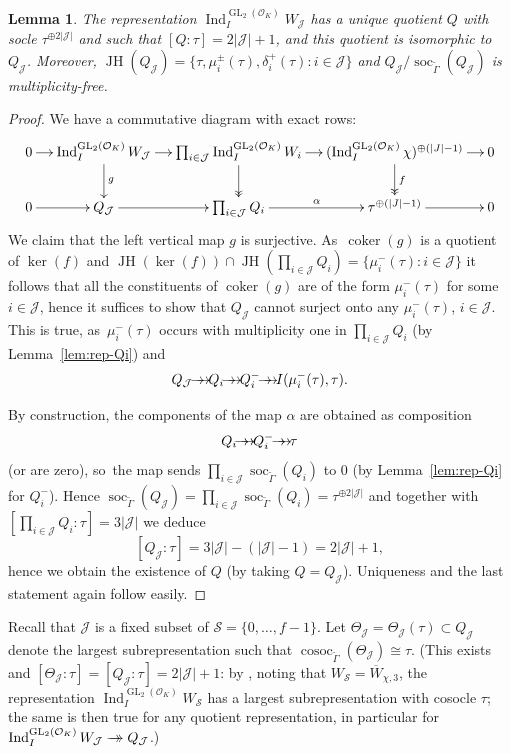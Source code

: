 \documentclass[JEP,XML,SOM,Unicode,NoFloatCountersInSection, NoEqCountersInSection,published]{cedram}
\newcommand{\onto}{\mathchoice{\to\hspace*{-5mm}\to}{\mathrel{\hbox{$\to\hspace*{-2.85mm}\to$}}}{\to\hspace*{-3mm}\to}{\to\hspace*{-3mm}\to}}
\let\wt\widetilde
\let\ovl\overline
\newcommand{\cJ}{{\mathcal{J}}}
\newcommand{\cO}{\mathcal{O}}
\newcommand{\cS}{\mathcal{S}}
\DeclareMathOperator{\coker}{coker}
\DeclareMathOperator{\cosoc}{cosoc}
\DeclareMathOperator{\GL}{GL}
\DeclareMathOperator{\Ind}{Ind}
\DeclareMathOperator{\JH}{\mathrm{JH}}
\DeclareMathOperator{\soc}{soc}
\theoremstyle{plain}
\newtheorem{lem}[prop]{Lemma}
\theoremstyle{definition}
\begin{document}
\begin{lem}\label{lem:rep-QJ}
The representation $\Ind_I^{\GL_2(\cO_K)} W_{\cJ}$ has a unique quotient $Q$ with socle $\tau^{\oplus 2\vert\cJ\vert}$ and such that $[Q:\tau] = 2\vert\cJ\vert+1$, and this quotient is isomorphic to $Q_{\cJ}$.
Moreover, $\JH(Q_\cJ) = \{\tau, \mu_i^\pm(\tau), \delta_i^+(\tau): i \in \cJ \}$ and $Q_\cJ/\soc_{\wt\Gamma}(Q_\cJ)$ is multiplicity-free.
\end{lem}

\begin{proof}
We have a commutative diagram with exact rows:\vspace*{-3pt}
\begin{equation*}
\xymatrix@C=.4cm@R=.7cm{
0 \ar[r] & \Ind_I^{\GL_2(\cO_K)} W_\cJ \ar[r]\ar^g[d] & \prod_{i \in \cJ} \Ind_I^{\GL_2(\cO_K)} W_i \ar[r]\ar@{->>}[d] & (\Ind_I^{\GL_2(\cO_K)} \chi)^{\oplus (|J|-1)}\ar@{->>}^f[d] \ar[r] & 0 \\
0 \ar[r] & Q_\cJ \ar[r] & \prod_{i \in \cJ} Q_i \ar^\alpha[r] & \tau^{\oplus (|J|-1)} \ar[r] & 0
}
\end{equation*}
We claim that the left vertical map $g$ is surjective. As~$\coker(g)$ is a quotient of $\ker(f)$ and $\JH(\ker(f)) \cap \JH(\prod_{i \in \cJ} Q_i) = \{\mu_i^-(\tau): i \in \cJ\}$ it follows that all the constituents of $\coker(g)$ are of the form $\mu_i^-(\tau)$ for some $i\in \cJ$, hence it suffices to show that $Q_\cJ$ cannot surject onto any $\mu_i^-(\tau)$, $i \in \cJ$.
This is true, as~$\mu_i^-(\tau)$ occurs with multiplicity one in $\prod_{i \in \cJ} Q_i$ (by Lemma~\ref{lem:rep-Qi}) and\vspace*{-3pt}
\[
Q_\cJ \onto Q_i \onto Q_i^- \onto I(\mu_i^-(\tau),\tau).
\]

By construction, the components of the map $\alpha$ are obtained as composition\vspace*{-3pt}
\[
Q_i \onto Q_i^- \onto \tau
\]
(or are zero), so~the map sends $\prod_{i \in \cJ} \soc_{\wt\Gamma}(Q_i)$ to $0$ (by Lemma~\ref{lem:rep-Qi} for $Q_i^-$).
Hence $\soc_{\wt\Gamma}(Q_\cJ) = \prod_{i \in \cJ} \soc_{\wt\Gamma}(Q_i) = \tau^{\oplus 2|\cJ|}$ and together with $[\prod_{i \in \cJ} Q_i: \tau]=3\vert\cJ\vert$ we deduce
\[
[Q_{\cJ}:\tau]=3\vert\cJ\vert-(\vert\cJ\vert-1)=2\vert\cJ\vert+1,
\]
hence we obtain the existence of $Q$ (by taking $Q=Q_{\cJ}$).
Uniqueness and the last statement again follow easily.
\end{proof}

Recall that $\cJ$ is a fixed subset of $\cS = \{0,\dots,f-1\}$.
Let $\Theta_\cJ=\Theta_\cJ(\tau) \subset Q_\cJ$ denote the largest subrepresentation such that $\cosoc_{\wt\Gamma}(\Theta_\cJ) \cong \tau$.
(This exists and $[\Theta_\cJ:\tau] = [Q_\cJ:\tau] = 2|\cJ|+1$:
by \cite[Prop.\,3.10]{HuWang2}, noting that $W_\cS=\ovl{W}_{\chi,3}$, the representation $\Ind_I^{\GL_2(\cO_K)} W_\cS$ has a largest subrepresentation with cosocle $\tau$; the same is then true for any quotient representation, in particular for $\Ind_I^{\GL_2(\cO_K)} W_\cJ \onto Q_{\cJ}$.)
\end{document}
